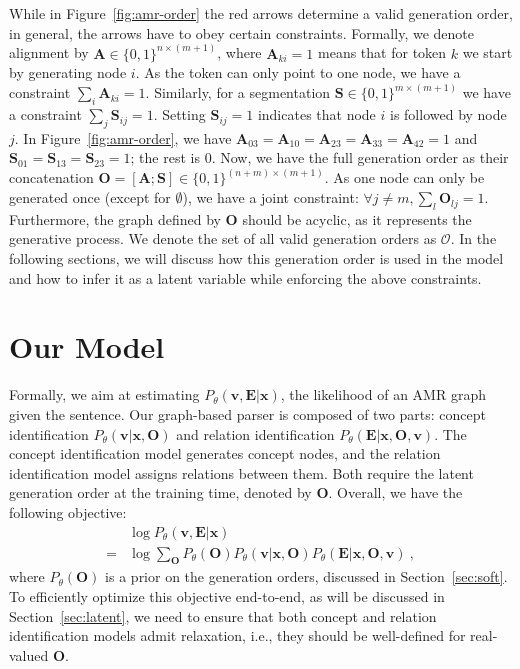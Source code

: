 \documentclass[11pt]{article}
\begin{document}
 \quad
While in Figure~\ref{fig:amr-order} the red arrows determine a 
valid generation order, in general, the arrows have to obey certain constraints. Formally, we denote alignment by $\mathbf{A} \in  \{0,1\}^{ n \times (m +1)}$, where $\mathbf{A}_{ki}=1$ means that for token $k$ we start by generating node $i$. As the token can only point to one node, we have a constraint $\sum_i \mathbf{A}_{ki}=1$. Similarly, for a segmentation $\mathbf{S} \in  \{0,1\}^{ m \times (m +1)} $ we have a constraint $ \sum_{j}\mathbf{S} _{ij} = 1 $. Setting $\mathbf{S}_{ij} =1 $ indicates that node $i$ is followed by node $j$.  In Figure~\ref{fig:amr-order}, 
we have $\mathbf{A}_{03}=\mathbf{A}_{10}=\mathbf{A}_{23} = \mathbf{A}_{33}=\mathbf{A}_{42} = 1$ and $\mathbf{S}_{01}=\mathbf{S}_{13}=\mathbf{S}_{23} = 1$; the rest is $0$.
Now, we have the full generation order as their concatenation $ \mathbf{O}= [\mathbf{A} ; \mathbf{S}] \in  \{0,1\}^{ (n+m) \times (m +1)}$. As one node can only be generated once (except for $\emptyset$), we have a joint constraint: $\forall j \neq m, \sum_{l} \mathbf{O}_{lj} =1$.  Furthermore, the graph defined by $\mathbf{O}$ should be acyclic, as it represents the generative process. We denote the set of all valid generation orders as $\mathcal{O}$. 
In the following sections, we will discuss how this generation order is used in the model and how to infer it as a latent variable while enforcing the above constraints. \section{Our Model}\label{sec:main}
Formally, we aim at estimating $P_\theta(\mathbf{v},\mathbf{E}|\mathbf{x})$, the likelihood of an AMR graph given the sentence. Our graph-based parser is composed of two parts: concept identification $P_\theta(\mathbf{v}|\mathbf{x},\mathbf{O})$ and relation identification $P_\theta(\mathbf{E}|\mathbf{x},\mathbf{O},\mathbf{v})$. The concept identification model generates concept nodes, and the relation identification model assigns relations  between them. Both require the latent generation order at the training time,  denoted by $\mathbf{O}$. 
Overall, we have the following objective:
\begin{align}
   & \log P_\theta(\mathbf{v},\mathbf{E}|\mathbf{x})   \\
    = &\log \sum_{\mathbf{O} } {P_\theta(\mathbf{O}) P_\theta(\mathbf{v}|\mathbf{x},\mathbf{O}) P_\theta(\mathbf{E}|\mathbf{x},\mathbf{O},\mathbf{v}) } ~\label{eq:joint_margin},
\end{align}
where $P_\theta(\mathbf{O})$ is a prior on the generation orders, discussed in Section~\ref{sec:soft}. 
To efficiently optimize this objective end-to-end, as will be discussed in Section~\ref{sec:latent},
we need to ensure that both concept and relation identification models admit relaxation, i.e., they should be well-defined for real-valued $\mathbf{O}$.  
\end{document}
